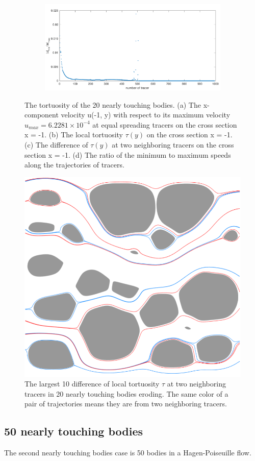 \documentclass[preprint, 10pt]{elsarticle}
\begin{document}
\begin{figure}[H]
\begin{subfigure}[b]{0.5\textwidth}
\includegraphics*[width =\linewidth]{./figs/uminDumax20_268}
\caption{}
\end{subfigure}
\caption{\label{fig:Eroding20tort} The tortuosity of the 20 nearly touching bodies.
(a) The 
x-component velocity u(-1, y) with respect to its maximum velocity $u_{max}=6.2281
\times 10^{-4}$ at equal spreading tracers on the cross section x = -1. 
(b) The local tortuosity $\tau(y)$ on the cross section x = -1. 
(c) The difference of $\tau(y)$ at two neighboring tracers on the cross section x = -1.
(d) The ratio of the minimum to maximum speeds along the trajectories of tracers.}
\end{figure}

\begin{figure}[H]
\center
\includegraphics*[width =0.5\linewidth]{./figs/tort_diff_top10_268}
\caption{\label{fig:Eroding20tort_traj} The largest 10 difference of 
local tortuosity $\tau$ at two neighboring tracers in
 20 nearly touching bodies eroding. The same color of a pair of trajectories 
means they are from two neighboring tracers.}
\end{figure}


\subsection{50 nearly touching bodies}
{\color{red}
The second nearly touching bodies case is 50 bodies in a Hagen-Poiseuille flow.
}
\end{document}
